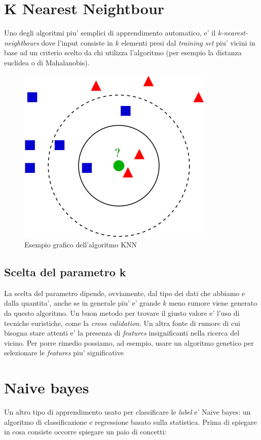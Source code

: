 \section*{K Nearest Neightbour}
Uno degli algoritmi piu' semplici di apprendimento automatico, e' il \textit{k-nearest-neightbours} dove l'input consiste in $k$ elementi presi dal \textit{training set} piu' vicini in base ad un criterio scelto da chi utilizza l'algoritmo (per esempio la distanza euclidea o di Mahalanobis).


\begin{figure}[H]
	\centering
	\includegraphics[width=0.7\linewidth]{img/knn_example}
	\caption{Esempio grafico dell'algoritmo KNN}
	\label{fig:knnexample}
\end{figure}


\subsection*{Scelta del parametro k}
La scelta del parametro dipende, ovviamente, dal tipo dei dati che abbiamo e dalla quantita', anche se in generale piu' e' grande $k$ meno rumore viene generato da questo algoritmo. Un buon metodo per trovare il giusto valore e' l'uso di tecniche euristiche, come la \textit{cross validation}. Un altra fonte di rumore di cui bisogna stare attenti e' la presenza di \textit{features} insignificanti nella ricerca del vicino. Per porre rimedio possiamo, ad esempio, usare un algoritmo genetico per selezionare le \textit{features} piu' significative

\section*{Naive bayes}
Un altro tipo di apprendimento usato per classificare le \textit{label} e' Naive bayes: un algoritmo di classificazione e regressione basato sulla statistica. Prima di spiegare in cosa consiste occorre spiegare un paio di concetti:
